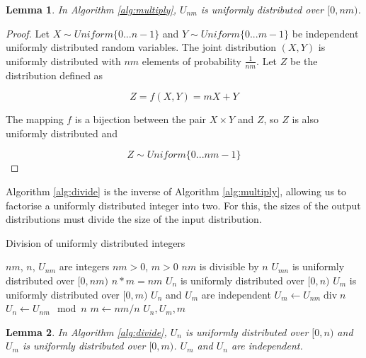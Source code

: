 \documentclass[12pt]{article}
\newtheorem{lemma}{Lemma}
\begin{document}
\begin{lemma}
In Algorithm \ref{alg:multiply}, $U_{nm}$ is uniformly distributed over $[0,nm)$.
\label{lem:multiply}
\end{lemma}

\begin{proof}
Let $X \sim Uniform \{0 ... n-1\}$ and $Y \sim Uniform\{0 ... m-1\}$ be independent uniformly distributed random variables. The joint distribution $(X,Y)$ is uniformly distributed with $nm$ elements of probability $\frac{1}{nm}$. Let $Z$ be the distribution defined as

\begin{equation}
Z = f(X,Y) = mX+Y
\end{equation}

The mapping $f$ is a bijection between the pair $X \times Y$ and $Z$, so $Z$ is also uniformly distributed and 

\begin{equation}
Z \sim Uniform \{0 ... nm-1\}
\end{equation}
\end{proof}

Algorithm \ref{alg:divide} is the inverse of Algorithm \ref{alg:multiply}, allowing us to factorise a uniformly distributed integer into two. For this, the sizes of the output distributions must divide the size of the input distribution.

\begin{algorithm}
\caption{Division of uniformly distributed integers}
\label{alg:divide}
\begin{algorithmic}[1]
    \Require $nm$, $n$, $U_{nm}$ are integers
    \Require $nm>0$, $m>0$
    \Require $nm$ is divisible by $n$
    \Require $U_{mn}$ is uniformly distributed over $[0,nm)$
    \Ensure $n * m = nm$
    \Ensure $U_{n}$ is uniformly distributed over $[0,n)$
    \Ensure $U_{m}$ is uniformly distributed over $[0,m)$
    \Ensure $U_n$ and $U_m$ are independent
  \State $U_m \gets U_{nm} \operatorname{div} n$
  \State $U_{n} \gets U_{nm} \mod n$
  \State $m \gets nm / n$
  \State \Return $U_n, U_m, m$
\EndProcedure
\end{algorithmic}
\end{algorithm}

\begin{lemma}
In Algorithm \ref{alg:divide}, $U_n$ is uniformly distributed over $[0,n)$ and $U_m$ is uniformly distributed over $[0,m)$. $U_m$ and $U_n$ are independent.

\label{lem:divide}
\end{lemma}
\end{document}
